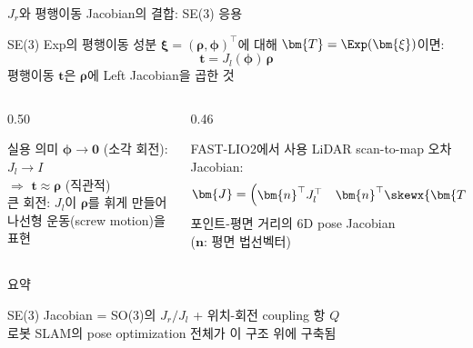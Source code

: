 \begin{frame}[shrink=5]{$J_r$와 평행이동 Jacobian의 결합: SE(3) 응용}
  \begin{block}{SE(3) Exp의 평행이동 성분}
    $\bm{\xi} = (\bm{\rho}, \bm{\phi})^\top$에 대해 $\bm{T} = \Exp(\bm{\xi})$이면:
    \[
      \bm{t} = J_l(\bm{\phi})\,\bm{\rho}
    \]
    평행이동 $\bm{t}$은 $\bm{\rho}$에 Left Jacobian을 곱한 것
  \end{block}
  \pause
  \begin{columns}[T]
    \begin{column}{0.50\textwidth}
      \begin{alertblock}{실용 의미}
        $\bm{\phi} \to \bm{0}$ (소각 회전): $J_l \to I$\\
        $\Rightarrow$ $\bm{t} \approx \bm{\rho}$ (직관적)\\
        \medskip
        큰 회전: $J_l$이 $\bm{\rho}$를 휘게 만들어\\
        나선형 운동(screw motion)을 표현
      \end{alertblock}
    \end{column}
    \begin{column}{0.46\textwidth}
      \begin{exampleblock}{FAST-LIO2에서 사용}
        LiDAR scan-to-map 오차 Jacobian:\\
        \[
          \bm{J} = \begin{pmatrix} \bm{n}^\top J_l^\top & \bm{n}^\top\skewx{\bm{T}\bm{p}} \end{pmatrix}
        \]
        포인트-평면 거리의 6D pose Jacobian\\
        ($\bm{n}$: 평면 법선벡터)
      \end{exampleblock}
    \end{column}
  \end{columns}
  \pause
  \vspace{0.3em}
  \begin{block}{요약}
    \begin{center}
      SE(3) Jacobian = SO(3)의 $J_r/J_l$ + 위치-회전 coupling 항 $Q$\\
      로봇 SLAM의 pose optimization 전체가 이 구조 위에 구축됨
    \end{center}
  \end{block}
\end{frame}


